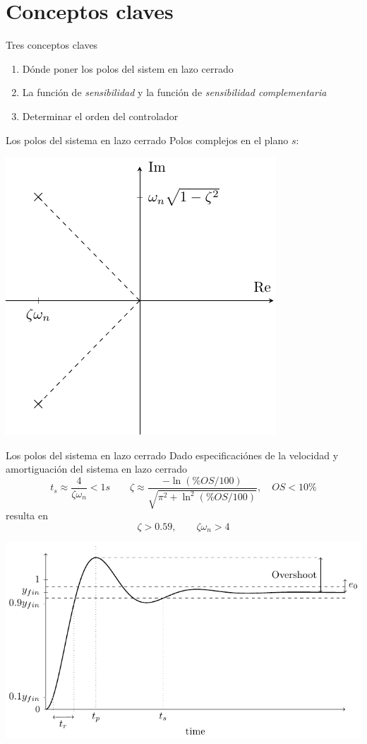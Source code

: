 \documentclass[presentation,aspectratio=169]{beamer}
\begin{document}
\section{Conceptos claves}
\label{sec:orgd785da9}
\begin{frame}[label={sec:orgeca44aa}]{Tres conceptos claves}
\begin{enumerate}
\item Dónde poner los polos del sistem en lazo cerrado
\item La función de \emph{sensibilidad} y la función de \emph{sensibilidad complementaria}
\item Determinar el orden del controlador
\end{enumerate}
\end{frame}

\begin{frame}[label={sec:org1856626}]{Los polos del sistema en lazo cerrado}
Polos complejos en el plano \(s\):
\begin{center}
\includegraphics[width=0.45\linewidth]{../../figures/implane-second-order-poles}
\end{center}
\end{frame}

\begin{frame}[label={sec:org3815671}]{Los polos del sistema en lazo cerrado}
Dado especificaciónes de la velocidad y amortiguación del sistema en lazo cerrado
\[ t_s \approx \frac{4}{\zeta\omega_n} < 1 s \qquad \zeta \approx \frac{-\ln (\%OS/100)}{\sqrt{\pi^2 + \ln^2(\%OS/100)}}, \quad OS < 10\%  \]
resulta en 
\[ \zeta > 0.59,  \qquad \zeta\omega_n > 4\]

\begin{center}
\includegraphics[width=0.6\linewidth]{../../figures/step-response-specifications}
\end{center}
\end{frame}
\end{document}
